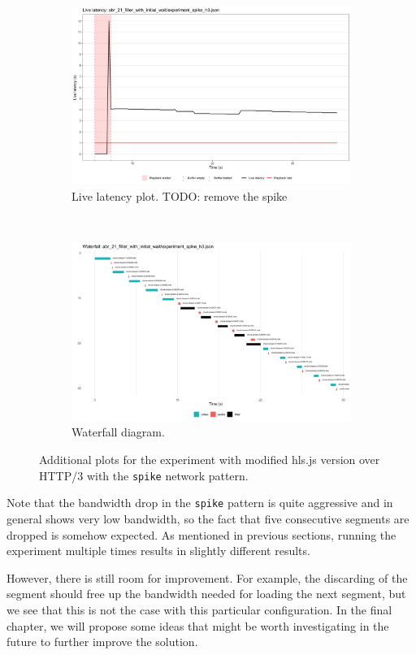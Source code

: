 \begin{figure}[h]
	\centering
	
	\begin{subfigure}[t]{0.45\textwidth}
		\centering
		\includegraphics[width=\textwidth]{res/impr_hls_filler_latency.png}
		\caption{Live latency plot. TODO: remove the spike}
		\label{fig:filler2_latency}
	\end{subfigure}%
	~ 
	\begin{subfigure}[t]{0.45\textwidth}
		\centering
		\includegraphics[width=\textwidth]{res/impr_hls_filler_waterfall.png}
		\caption{Waterfall diagram.}
		\label{fig:filler2_waterfall}
	\end{subfigure}
	
	\caption{Additional plots for the experiment with modified hls.js version over HTTP/3 with the \texttt{spike} network pattern.}
	\label{fig:filler2}
\end{figure}

Note that the bandwidth drop in the \texttt{spike} pattern is quite aggressive and in general shows very low bandwidth, so the fact that five consecutive segments are dropped is somehow expected. As mentioned in previous sections, running the experiment multiple times results in slightly different results.

However, there is still room for improvement. For example, the discarding of the segment should free up the bandwidth needed for loading the next segment, but we see that this is not the case with this particular configuration. In the final chapter, we will propose some ideas that might be worth investigating in the future to further improve the solution.


